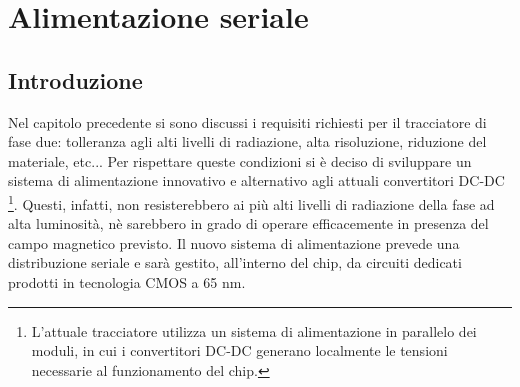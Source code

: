 \chapter{Alimentazione seriale}
\section{Introduzione}
Nel capitolo precedente si sono discussi i requisiti richiesti per il tracciatore di fase due: tolleranza agli alti livelli di radiazione, alta risoluzione, riduzione del materiale, etc...
Per rispettare queste condizioni si è deciso di sviluppare un sistema di alimentazione innovativo e alternativo agli attuali convertitori DC-DC
\footnote{
  L'attuale tracciatore utilizza un sistema di alimentazione in parallelo dei moduli, in cui i convertitori DC-DC generano localmente le tensioni necessarie al funzionamento del chip.
}.
Questi, infatti, non resisterebbero ai più alti livelli di radiazione della fase ad alta luminosità, nè sarebbero in grado di operare efficacemente in presenza del campo magnetico previsto.
Il nuovo sistema di alimentazione prevede una distribuzione seriale e sarà gestito, all'interno del chip, da circuiti dedicati prodotti in tecnologia CMOS a 65 nm.

